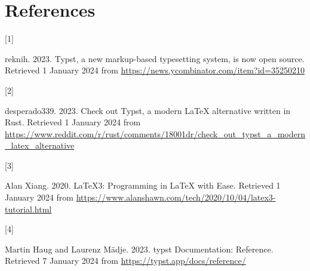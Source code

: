 \documentclass[
  a4paper,
]{article}
\newlength{\cslhangindent}
\newlength{\csllabelwidth}
\newlength{\cslentryspacingunit} %
\newenvironment{CSLReferences}[2] %
 {%
  \setlength{\parindent}{0pt}
  \ifodd #1
  \let\oldpar\par
  \def\par{\hangindent=\cslhangindent\oldpar}
  \fi
  \setlength{\parskip}{#2\cslentryspacingunit}
 }%
 {}
\newcommand{\CSLLeftMargin}[1]{\parbox[t]{\csllabelwidth}{#1}}
\newcommand{\CSLRightInline}[1]{\parbox[t]{\linewidth - \csllabelwidth}{#1}\break}
\begin{document}
\hypertarget{bibliography}{%
\section*{References}\label{bibliography}}

\hypertarget{refs}{}
\begin{CSLReferences}{0}{0}
\leavevmode{}%
\CSLLeftMargin{{[}1{]} }%
\CSLRightInline{reknih. 2023. {Typst, a new markup-based typesetting
system, is now open source}. Retrieved 1 January 2024 from
\url{https://news.ycombinator.com/item?id=35250210}}

\leavevmode{}%
\CSLLeftMargin{{[}2{]} }%
\CSLRightInline{desperado339. 2023. {Check out Typst, a modern LaTeX
alternative written in Rust}. Retrieved 1 January 2024 from
\url{https://www.reddit.com/r/rust/comments/18001dr/check_out_typst_a_modern_latex_alternative}}

\leavevmode{}%
\CSLLeftMargin{{[}3{]} }%
\CSLRightInline{Alan Xiang. 2020. {LaTeX3: Programming in LaTeX with
Ease}. Retrieved 1 January 2024 from
\url{https://www.alanshawn.com/tech/2020/10/04/latex3-tutorial.html}}

\leavevmode{}%
\CSLLeftMargin{{[}4{]} }%
\CSLRightInline{Martin Haug and Laurenz Mädje. 2023. {typst
Documentation: Reference}. Retrieved 7 January 2024 from
\url{https://typst.app/docs/reference/}}

\end{CSLReferences}
\end{document}
